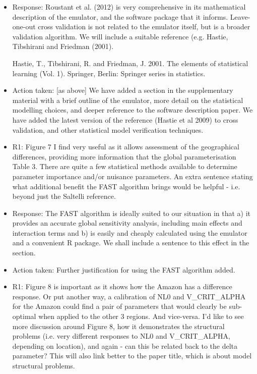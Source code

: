 \documentclass[esd, manuscript]{copernicus}
\begin{document}
\begin{itemize}
\item{Response: Roustant et al. (2012) is very comprehensive in its mathematical description of the emulator, and the software package that it informs. Leave-one-out cross validation is not related to the emulator itself, but is a broader validation algorithm. We will include a suitable reference (e.g. Hastie, Tibshirani and Friedman (2001).}

Hastie, T., Tibshirani, R. and Friedman, J. 2001. The elements of statistical learning (Vol. 1). Springer, Berlin: Springer series in statistics.

\item{Action taken: [as above] We have added a section in the supplementary material with a brief outline of the emulator, more detail on the statistical modelling choices, and deeper reference to the software description paper. We have added the latest version of the reference (Hastie et al 2009) to cross validation, and other statistical model verification techniques.}

\item{R1: Figure 7 I find very useful as it allows assessment of the geographical differences, providing more information that the global parameterisation Table 3. There are quite a few statistical methods available to determine parameter importance and/or nuisance parameters. An extra sentence stating what additional benefit the FAST algorithm brings would be helpful - i.e. beyond just the Saltelli reference.}

\item{Response: The FAST algorithm is ideally suited to our situation in that a) it provides an accurate global sensitivity analysis, including main effects and interaction terms and b) is easily and cheaply calculated using the emulator and a convenient R package. We shall include a sentence to this effect in the section.}

\item{Action taken:  Further justification for using the FAST algorithm added.}

\item{R1: Figure 8 is important as it shows how the Amazon has a difference response. Or put another way, a calibration of NL0 and V\_CRIT\_ALPHA for the Amazon could find a pair of parameters that would clearly be sub-optimal when applied to the other 3 regions. And vice-versa. I'd like to see more discussion around Figure 8, how it demonstrates the structural problems (i.e. very different responses to NL0 and V\_CRIT\_ALPHA, depending on location), and again - can this be related back to the delta parameter? This will also link better to the paper title, which is about model structural problems.}


\end{itemize}
\end{document}
